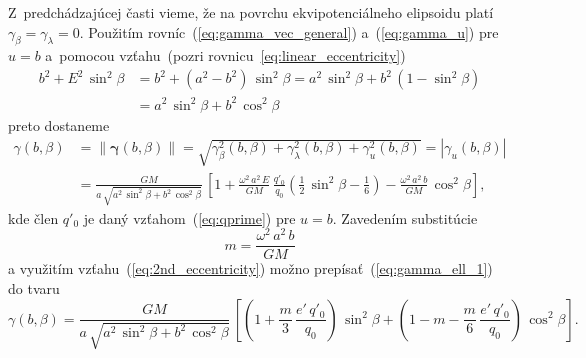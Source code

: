 \documentclass[a4paper,12pt]{book}
\begin{document}
Z~predchádzajúcej časti vieme, že na povrchu ekvipotenciálneho elipsoidu platí 
$\gamma_\beta = \gamma_\lambda = 0$.  Použitím 
rovníc~(\ref{eq:gamma_vec_general}) a~(\ref{eq:gamma_u}) pre $u = b$ a~pomocou 
vzťahu~(pozri rovnicu~\ref{eq:linear_eccentricity})
%
\begin{equation}
\begin{split}
b^2 + E^2 \, \sin^2\beta &= b^2 + (a^2 - b^2) \, \sin^2\beta = a^2 \, 
\sin^2\beta + b^2 \, (1 - \sin^2\beta)\\
%
&= a^2 \, \sin^2\beta + b^2 \, \cos^2\beta
\end{split}
\end{equation}
%
preto dostaneme
%
\begin{equation}
\label{eq:gamma_ell_1}
\begin{split}
\gamma(b, \beta) &= \| \boldsymbol \gamma(b, \beta) \| 
= \sqrt{\gamma^2_\beta(b, \beta) + \gamma^2_\lambda(b, \beta) + \gamma^2_u(b, 
\beta)} = | \gamma_u(b, \beta) |\\
%
&= \frac{GM}{a \, \sqrt{a^2 \, \sin^2\beta + b^2 \, \cos^2\beta}} \, \left[ 
1 + \frac{\omega^2 \, a^2 \, E}{GM} \, \frac{q'_0}{q_0} \left( \frac{1}{2} \, 
\sin^2\beta - \frac{1}{6} \right) - \frac{\omega^2 \, a^2 \, b}{GM} \, 
\cos^2\beta \right]
{,}
\end{split}
\end{equation}
%
kde člen $q'_0$ je daný vzťahom~(\ref{eq:qprime}) pre $u = b$.  Zavedením 
substitúcie
%
\begin{equation}
m = \frac{\omega^2 \, a^2 \, b}{GM}
\end{equation}
%
a využitím vzťahu~(\ref{eq:2nd_eccentricity}) možno 
prepísať~(\ref{eq:gamma_ell_1}) do tvaru
%
\begin{equation}
\label{eq:gamma_ell_2}
\gamma(b, \beta) = \frac{GM}{a \, \sqrt{a^2 \, \sin^2\beta + b^2 \, 
\cos^2\beta}} \, \left[ \left( 1 + \frac{m}{3} \, \frac{e' \, q'_0}{q_0} 
\right) \, \sin^2\beta + \left( 1 - m - \frac{m}{6} \, \frac{e' \, q'_0}{q_0} 
\right) \, \cos^2\beta
\right]{.}
\end{equation}
\end{document}
